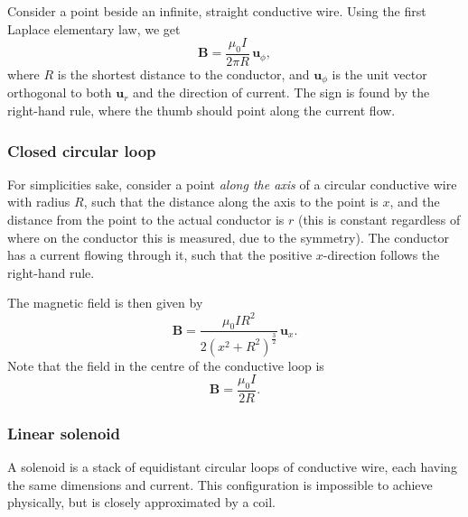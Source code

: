 \documentclass[a4paper, 12pt]{article}
\renewcommand{\vec}[1]{\mathbf{#1}}
\newcommand{\B}{\ensuremath{\vec{B}}}
\begin{document}
            Consider a point beside an infinite, straight conductive wire. Using the first Laplace elementary law, we get 
            \begin{equation}
                \B = \frac{\mu_0 I}{2\pi R}\,\vec{u}_\phi,
            \end{equation}
            where $R$ is the shortest distance to the conductor, 
            and $\vec{u}_\phi$ is the  unit vector orthogonal to both $\vec{u}_r$ and the direction of current.
            The sign is found by the right-hand rule, where the thumb should point along the current flow.
            
        \subsubsection{Closed circular loop}
            For simplicities sake, consider a point \textit{along the axis} of a circular conductive wire with radius $R$, 
            such that the distance along the axis to the point is $x$, 
            and the distance from the point to the actual conductor is $r$ 
            (this is constant regardless of where on the conductor this is measured, due to the symmetry).
            The conductor has a current flowing through it, such that the positive $x$-direction follows the right-hand rule. 

            The magnetic field is then given by
            \begin{equation}
                \B = \frac{\mu_0 I R^2}{2 \left(x^2 + R^2\right)^\frac{3}{2}}\,\vec{u}_x.
            \end{equation}
            Note that the field in the centre of the conductive loop is
            \begin{equation}
                \B = \frac{\mu_0 I}{2R}.
            \end{equation}
        
        \subsubsection{Linear solenoid}
            A solenoid is a stack of equidistant circular loops of conductive wire, each having the same dimensions and current. 
            This configuration is impossible to achieve physically, but is closely approximated by a coil. 
\end{document}
